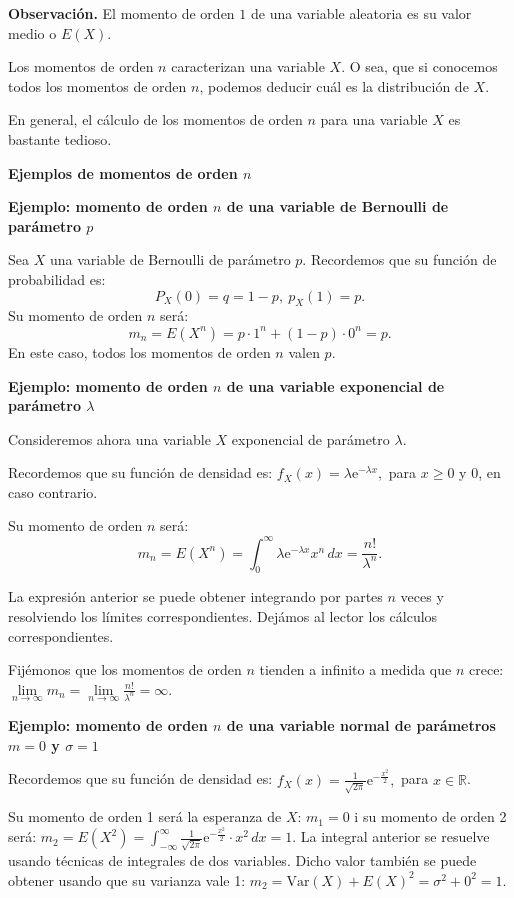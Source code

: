 \documentclass[]{book}
\begin{document}
 \textbf{Observación.}
El momento de orden \(1\) de una variable aleatoria es su valor medio o \(E(X)\).

Los momentos de orden \(n\) caracterizan una variable \(X\). O sea, que si conocemos todos los momentos de orden \(n\), podemos deducir cuál es la distribución de \(X\).

En general, el cálculo de los momentos de orden \(n\) para una variable \(X\) es bastante tedioso.

\textbf{Ejemplos de momentos de orden \(n\)}

\textbf{Ejemplo: momento de orden \(n\) de una variable de Bernoulli de parámetro \(p\)}

Sea \(X\) una variable de Bernoulli de parámetro \(p\). Recordemos que su función de probabilidad es:
\[
P_X(0)=q=1-p,\ p_X(1)=p.
\]
Su momento de orden \(n\) será:
\[
m_n = E\left(X^n\right)=p\cdot 1^n+(1-p)\cdot 0^n = p.
\]
En este caso, todos los momentos de orden \(n\) valen \(p\).

\textbf{Ejemplo: momento de orden \(n\) de una variable exponencial de parámetro \(\lambda\)}

Consideremos ahora una variable \(X\) exponencial de parámetro \(\lambda\).

Recordemos que su función de densidad es: \(f_X(x)=\lambda \mathrm{e}^{-\lambda x},\) para \(x\geq 0\) y \(0\), en caso contrario.

Su momento de orden \(n\) será:
\[
m_n = E\left(X^n\right)=\int_0^\infty \lambda \mathrm{e}^{-\lambda x} x^n\, dx =\frac{n!}{\lambda^n}.
\]

La expresión anterior se puede obtener integrando por partes \(n\) veces y resolviendo los límites correspondientes. Dejámos al lector los cálculos correspondientes.

Fijémonos que los momentos de orden \(n\) tienden a infinito a medida que \(n\) crece: \(\lim\limits_{n\to\infty}m_n = \lim\limits_{n\to\infty}\frac{n!}{\lambda^n}=\infty\).

\textbf{Ejemplo: momento de orden \(n\) de una variable normal de parámetros \(m=0\) y \(\sigma =1\)}

Recordemos que su función de densidad es: \(f_X(x)=\frac{1}{\sqrt{2\pi}}\mathrm{e}^{-\frac{x^2}{2}},\) para \(x\in \mathbb{R}\).

Su momento de orden 1 será la esperanza de \(X\): \(m_1 = 0\) i su momento de orden 2 será:
\(m_2 = E\left(X^2\right)=\int_{-\infty}^\infty \frac{1}{\sqrt{2\pi}}\mathrm{e}^{-\frac{x^2}{2}}\cdot x^2\, dx = 1.\)
La integral anterior se resuelve usando técnicas de integrales de dos variables.
Dicho valor también se puede obtener usando que su varianza vale 1:
\(m_2 = \mathrm{Var}(X)+E(X)^2 = \sigma^2 +0^2 = 1.\)
\end{document}
